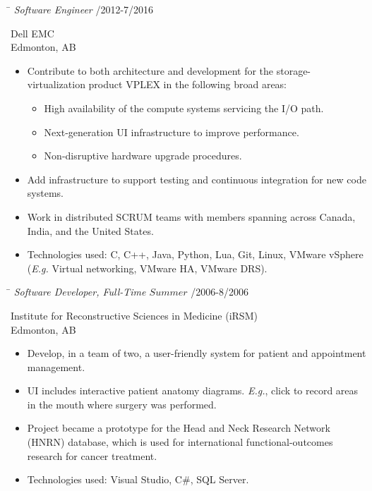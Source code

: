 \documentclass{res}
\begin{document}
\begin{resume}
    \vspace{-0.1in}
    \begin{tabbing}
    \hspace{5.15in}\= \kill  %
    \textit{Software Engineer} /2012-7/2016
    \end{tabbing}\vspace{-22pt}  %
    Dell EMC\\
    Edmonton, AB\\
    \vspace{-1.5ex}\begin{itemize}[noitemsep]
    \item Contribute to both architecture and development for the storage-virtualization product VPLEX in the following broad areas:
    \begin{itemize}[noitemsep]
    \item High availability of the compute systems servicing the I/O path.
    \item Next-generation UI infrastructure to improve performance.
    \item Non-disruptive hardware upgrade procedures.
    \end{itemize}
    \item Add infrastructure to support testing and continuous integration for new code systems.
    \item Work in distributed SCRUM teams with members spanning across Canada, India, and the United States.
    \item Technologies used: C, C++, Java, Python, Lua, Git, Linux, VMware vSphere (\textit{E.g.} Virtual networking, VMware HA, VMware DRS).
    \end{itemize}

\clearpage

    \vspace{-0.1in}
    \begin{tabbing}
    \hspace{5.15in}\= \kill  %
    \textit{Software Developer, Full-Time \(Summer\)} /2006-8/2006
    \end{tabbing}\vspace{-22pt}  %
    Institute for Reconstructive Sciences in Medicine (iRSM)\\
    Edmonton, AB\\
    \vspace{-1.5ex}\begin{itemize}[noitemsep]
    \item Develop, in a team of two, a user-friendly system for patient and appointment management.
    \item UI includes interactive patient anatomy diagrams.  \textit{E.g.}, click to record areas in the mouth where surgery was performed.
    \item Project became a prototype for the Head and Neck Research Network (HNRN) database, which is used for international functional-outcomes research for cancer treatment.
    \item Technologies used: Visual Studio, C\#, SQL Server.
    \end{itemize}



\end{resume}
\end{document}
